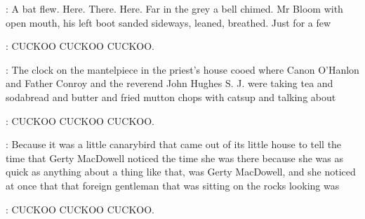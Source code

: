 \Bloom:
A bat flew. Here. There. Here. Far in the grey a bell chimed. Mr
Bloom with open mouth, his left boot sanded sideways, leaned, breathed.
Just for a few


:
   CUCKOO
    CUCKOO
    CUCKOO.


:
The clock on the mantelpiece in the priest's house cooed where Canon
O'Hanlon and Father Conroy and the reverend John Hughes S. J. were
taking tea and sodabread and butter and fried mutton chops with catsup
and talking about


:
   CUCKOO
    CUCKOO
    CUCKOO.


:
Because it was a little canarybird that came out of its little house to
tell the time that Gerty MacDowell noticed the time she was there because
she was as quick as anything about a thing like that, was Gerty MacDowell,
and she noticed at once that that foreign gentleman that was sitting on
the rocks looking was


:
   CUCKOO
   CUCKOO
   CUCKOO.
